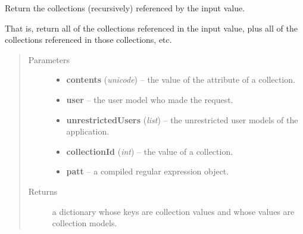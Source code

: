 \documentclass[letterpaper,10pt,english]{sphinxmanual}
\begin{document}

\begin{fulllineitems}
\label{api:onlinelinguisticdatabase.controllers.oldcollections.getCollectionsReferenced}
Return the collections (recursively) referenced by the input  value.

That is, return all of the collections referenced in the input 
value, plus all of the collections referenced in those collections, etc.
\begin{quote}\begin{description}
\item[{Parameters}] \leavevmode\begin{itemize}
\item {} 
\textbf{contents} (\emph{unicode}) -- the value of the  attribute of a collection.

\item {} 
\textbf{user} -- the user model who made the request.

\item {} 
\textbf{unrestrictedUsers} (\emph{list}) -- the unrestricted user models of the application.

\item {} 
\textbf{collectionId} (\emph{int}) -- the  value of a collection.

\item {} 
\textbf{patt} -- a compiled regular expression object.

\end{itemize}

\item[{Returns}] \leavevmode
a dictionary whose keys are collection  values and whose
values are collection models.

\end{description}\end{quote}

\end{fulllineitems}

\end{document}

